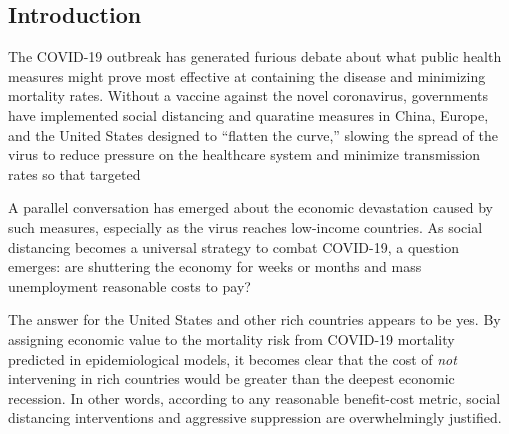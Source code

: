 \documentclass[11pt]{article}
\begin{document}
\begin{mdframed}


\doublespace

\section{Introduction}

The COVID-19 outbreak has generated furious debate about what public health measures might prove most effective at containing the disease and minimizing mortality rates. Without a vaccine against the novel coronavirus, governments have implemented social distancing and quaratine measures in China, Europe, and the United States designed to ``flatten the curve,'' slowing the spread of the virus to reduce pressure on the healthcare system and minimize transmission rates so that targeted %

A parallel conversation has emerged about the economic devastation caused by such measures, especially as the virus reaches low-income countries. As social distancing becomes a universal strategy to combat COVID-19, a question emerges: are shuttering the economy for weeks or months and mass unemployment reasonable costs to pay? 

The answer for the United States and other rich countries appears to be yes. By assigning economic value to the mortality risk from COVID-19 mortality predicted in epidemiological models, it becomes clear that the cost of \textit{not} intervening in rich countries would be greater than the deepest economic recession. In other words, according to any reasonable benefit-cost metric, social distancing interventions and aggressive suppression are overwhelmingly justified.


\end{mdframed}
\end{document}

